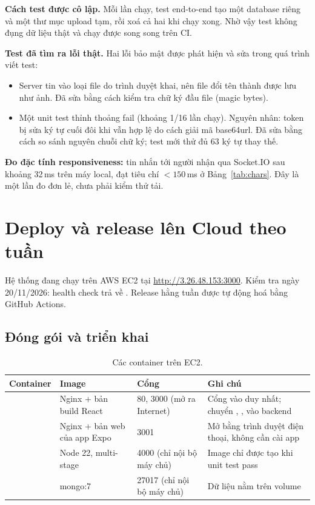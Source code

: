 \documentclass[11pt, a4paper]{article}
\begin{document}
\textbf{Cách test được cô lập.} Mỗi lần chạy, test end-to-end tạo một database riêng  và một thư mục upload tạm, rồi xoá cả hai khi chạy xong. Nhờ vậy test không đụng dữ liệu thật và chạy được song song trên CI.

\textbf{Test đã tìm ra lỗi thật.} Hai lỗi bảo mật được phát hiện và sửa trong quá trình viết test:
\begin{itemize}
  \item Server tin vào loại file do trình duyệt khai, nên file  đổi tên thành  được lưu như ảnh. Đã sửa bằng cách kiểm tra chữ ký đầu file (magic bytes).
  \item Một unit test thỉnh thoảng fail (khoảng 1/16 lần chạy). Nguyên nhân: token bị sửa ký tự cuối đôi khi vẫn hợp lệ do cách giải mã base64url. Đã sửa bằng cách so sánh nguyên chuỗi chữ ký; test mới thử đủ 63 ký tự thay thế.
\end{itemize}

\textbf{Đo đặc tính responsiveness:} tin nhắn tới người nhận qua Socket.IO sau khoảng 32\,ms trên máy local, đạt tiêu chí $<150$\,ms ở Bảng~\ref{tab:chars}. Đây là một lần đo đơn lẻ, chưa phải kiểm thử tải.

\section{Deploy và release lên Cloud theo tuần}
\label{sec:deploy}

Hệ thống đang chạy trên AWS EC2 tại \url{http://3.26.48.153:3000}. Kiểm tra ngày 20/11/2026: health check trả về . Release hằng tuần được tự động hoá bằng GitHub Actions.

\subsection{Đóng gói và triển khai}
\begin{table}[H]
  \centering
  \small
  \caption{Các container trên EC2.}
  \label{tab:containers}
  \begin{tabularx}{\linewidth}{lP{3.2cm}P{2.9cm}Y}
    \toprule
    \textbf{Container} & \textbf{Image} & \textbf{Cổng} & \textbf{Ghi chú} \\
    \midrule
     & Nginx + bản build React & 80, 3000 (mở ra Internet) & Cổng vào duy nhất; chuyển , ,  vào backend \\
     & Nginx + bản web của app Expo & 3001 & Mở bằng trình duyệt điện thoại, không cần cài app \\
     & Node 22, multi-stage & 4000 (chỉ nội bộ máy chủ) & Image chỉ được tạo khi unit test pass \\
     & mongo:7 & 27017 (chỉ nội bộ máy chủ) & Dữ liệu nằm trên volume  \\
    \bottomrule
  \end{tabularx}
\end{table}
\end{document}
